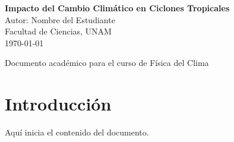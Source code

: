 \documentclass[12pt]{article}
\begin{document}
\begin{titlepage}
    \begin{center}
        \vspace*{2cm} %
        {\Huge\bfseries Impacto del Cambio Climático en Ciclones Tropicales}\\[1cm]
        {\Large Autor: Nombre del Estudiante}\\[0.5cm]
        {\large Facultad de Ciencias, UNAM}\\[1cm]
        {\large \today}
    \end{center}
    \vfill %
    \begin{center}
        {\small Documento académico para el curso de Física del Clima}
    \end{center}
\end{titlepage}

\section*{Introducción}

Aquí inicia el contenido del documento. \lipsum[1]
\end{document}
